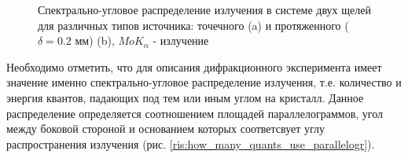 \begin{figure}[H]
  \centering
  \hfill
  \caption{Спектрально-угловое распределение излучения в системе двух щелей для различных типов источника: точечного (a)
  и протяженного ($\delta = 0.2$ мм) (b), $MoK_{\alpha}$ - излучение}
  \label{ris:sourc_map}
\end{figure}

Необходимо отметить, что для описания дифракционного эксперимента имеет значение именно
спектрально-угловое распределение излучения, т.е. количество и энергия квантов, падающих под тем
или иным углом на кристалл. Данное распределение определяется соотношением площадей параллелограммов,
угол между боковой стороной и основанием которых соответсвует углу распространения излучения
(рис. \ref{ris:how_many_quants_use_parallelogr}).

